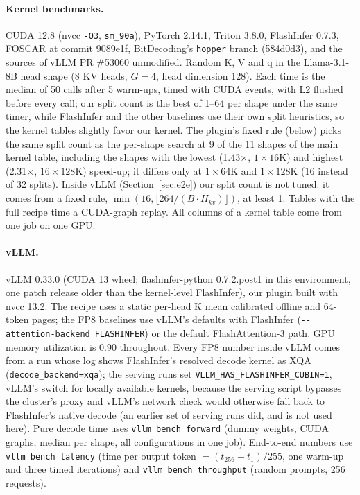 \documentclass[11pt]{article}
\begin{document}
\paragraph{Kernel benchmarks.} CUDA 12.8 (nvcc \texttt{-O3}, \texttt{sm\_90a}), PyTorch 2.14.1, Triton 3.8.0, FlashInfer 0.7.3, FOSCAR at commit 9089e1f, BitDecoding's \texttt{hopper} branch (584d0d3), and the sources of vLLM PR \#53060 unmodified. Random K, V and q in the Llama-3.1-8B head shape (8 KV heads, $G = 4$, head dimension 128). Each time is the median of 50 calls after 5 warm-ups, timed with CUDA events, with L2 flushed before every call; our split count is the best of 1--64 per shape under the same timer, while FlashInfer and the other baselines use their own split heuristics, so the kernel tables slightly favor our kernel. The plugin's fixed rule (below) picks the same split count as the per-shape search at 9 of the 11 shapes of the main kernel table, including the shapes with the lowest (1.43$\times$, $1 \times 16$K) and highest (2.31$\times$, $16 \times 128$K) speed-up; it differs only at $1 \times 64$K and $1 \times 128$K (16 instead of 32 splits). Inside vLLM (Section~\ref{sec:e2e}) our split count is not tuned: it comes from a fixed rule, $\min(16, \lfloor 264 / (B \cdot H_{kv}) \rfloor)$, at least 1. Tables with the full recipe time a CUDA-graph replay. All columns of a kernel table come from one job on one GPU.

\paragraph{vLLM.} vLLM 0.33.0 (CUDA 13 wheel; flashinfer-python 0.7.2.post1 in this environment, one patch release older than the kernel-level FlashInfer), our plugin built with nvcc 13.2. The recipe uses a static per-head K mean calibrated offline and 64-token pages; the FP8 baselines use vLLM's defaults with FlashInfer (\texttt{-{}-attention-backend}\allowbreak\ \texttt{FLASHINFER}) or the default FlashAttention-3 path. GPU memory utilization is 0.90 throughout. Every FP8 number inside vLLM comes from a run whose log shows FlashInfer's resolved decode kernel as XQA (\texttt{decode\_backend=xqa}); the serving runs set \texttt{VLLM\_HAS\_FLASHINFER\_CUBIN=1}, vLLM's switch for locally available kernels, because the serving script bypasses the cluster's proxy and vLLM's network check would otherwise fall back to FlashInfer's native decode (an earlier set of serving runs did, and is not used here). Pure decode time uses \texttt{vllm bench forward} (dummy weights, CUDA graphs, median per shape, all configurations in one job). End-to-end numbers use \texttt{vllm bench latency} (time per output token $= (t_{256} - t_1)/255$, one warm-up and three timed iterations) and \texttt{vllm bench throughput} (random prompts, 256 requests).
\end{document}
